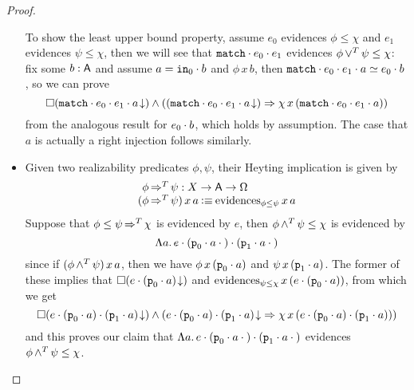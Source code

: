 \documentclass[11pt]{article}
\begin{document}
\begin{proof}
\begin{itemize}
      To show the least upper bound property, assume \(e_{0}\) evidences
      \(\phi \leq \chi\) and \(e_{1}\) evidences \(\psi \leq \chi\), then we
      will see that \({{\texttt{match}}\cdot{e_{0}}}\cdot{e_{1}}\)
      evidences \({{\phi}\mathop{\lor^{T}}{\psi}}\leq{\chi}\):
      fix some \(b:\mathsf{A}\) and assume \(a={\texttt{in}_0}\cdot{b}\) and \(\phi\,x\,b\),
      then
      \({{{{\texttt{match}}\cdot{e_{0}}}\cdot{e_{1}}}\cdot{a}}\simeq{{e_{0}}\cdot{b}}\),
      so we can prove
      \[
      \IAnd%
      {\IBox{(\ITotal{\IAp{\IAp{\IAp{\IMatchCode}{e_{0}}}{e_{1}}}{a}})}}%
      {(\IImplies%
      {(\ITotal{\IAp{\IAp{\IAp{\IMatchCode}{e_{0}}}{e_{1}}}{a}})}%
      {\chi\,x\,(\IAp{\IAp{\IAp{\IMatchCode}{e_{0}}}{e_{1}}}{a})})%
      }
      \]
      from the analogous result for \({e_{0}}\cdot{b}\), which holds by
      assumption.
      The case that \(a\) is actually a right injection follows similarly.


    \item Given two realizability predicates \(\phi,\psi\), their Heyting
      implication is given by
      \[\begin{array}{l}
          \phantom{(}{\phi}\mathop{\Rightarrow^{T}}{\psi} : {{X}\to{{{\ensuremath{\mathsf{A}}}\to{\Omega}}}}
          \\
          {({\phi}\mathop{\Rightarrow^{T}}{\psi})\,x\,a}
          \mathbin{\vcentcolon\equiv}
          {\text{evidences}_{{\phi}\leq{\psi}}\,x\,a}
        \end{array}\]
      Suppose that \({\phi}\leq{{\psi}\mathop{\Rightarrow^{T}}{\chi}}\) is evidenced
      by \(e\), then \({{\phi}\mathop{{\land^{T}}}{\psi}}\leq{\chi}\) is
      evidenced by
      \[
      \Lambda{a}.\,{{{e}\cdot{({{\texttt{p}_0}\cdot{a}}\cdot{)}}}\cdot{({{\texttt{p}_1}\cdot{a}}\cdot{)}}}
      \]
      since if \(({\phi}\mathop{{\land^{T}}}{\psi})\,x\,a\), then we have
      \(\phi\,x\,({\texttt{p}_0}\cdot{a})\) and \(\psi\,x\,({\texttt{p}_1}\cdot{a})\).
      The former of these implies that
      \(\Box{({{{e}\cdot{({\texttt{p}_0}\cdot{a})}}\!\downarrow})}\) and
      \(\text{evidences}_{{\psi}\leq{\chi}}\,x\,({e}\cdot{({\texttt{p}_0}\cdot{a})})\),
      from which we get
      \[
      \IAnd
      {\IBox{(\ITotal{\IAp{\IAp{e}{(\IAp{\IFstCode}{a})}}{(\IAp{\ISndCode}{a})}})}}%
      {(\IImplies%
      {\ITotal{\IAp{\IAp{e}{(\IAp{\IFstCode}{a})}}{(\IAp{\ISndCode}{a})}}}%
      {\chi\,x\,(\IAp{\IAp{e}{(\IAp{\IFstCode}{a})}}{(\IAp{\ISndCode}{a})})})}
      \]
      and this proves our claim that
      \(\Lambda{a}.\,{{{e}\cdot{({{\texttt{p}_0}\cdot{a}}\cdot{)}}}\cdot{({{\texttt{p}_1}\cdot{a}}\cdot{)}}}\)
      evidences \({{\phi}\mathop{{\land^{T}}}{\psi}}\leq{\chi}\).


\end{itemize}
\end{proof}
\end{document}
